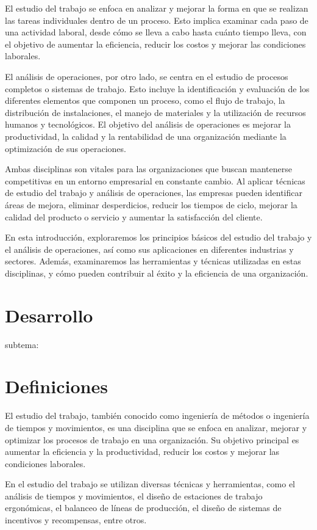 \documentclass[letterpaper,12pt,openright,oneside]{article}
\theoremstyle{plain}
\begin{document}
El estudio del trabajo se enfoca en analizar y mejorar la forma en que se realizan las tareas individuales dentro de un proceso. Esto implica examinar cada paso de una actividad laboral, desde cómo se lleva a cabo hasta cuánto tiempo lleva, con el objetivo de aumentar la eficiencia, reducir los costos y mejorar las condiciones laborales.

El análisis de operaciones, por otro lado, se centra en el estudio de procesos completos o sistemas de trabajo. Esto incluye la identificación y evaluación de los diferentes elementos que componen un proceso, como el flujo de trabajo, la distribución de instalaciones, el manejo de materiales y la utilización de recursos humanos y tecnológicos. El objetivo del análisis de operaciones es mejorar la productividad, la calidad y la rentabilidad de una organización mediante la optimización de sus operaciones.

Ambas disciplinas son vitales para las organizaciones que buscan mantenerse competitivas en un entorno empresarial en constante cambio. Al aplicar técnicas de estudio del trabajo y análisis de operaciones, las empresas pueden identificar áreas de mejora, eliminar desperdicios, reducir los tiempos de ciclo, mejorar la calidad del producto o servicio y aumentar la satisfacción del cliente.

En esta introducción, exploraremos los principios básicos del estudio del trabajo y el análisis de operaciones, así como sus aplicaciones en diferentes industrias y sectores. Además, examinaremos las herramientas y técnicas utilizadas en estas disciplinas, y cómo pueden contribuir al éxito y la eficiencia de una organización.
\section {Desarrollo}

subtema: 
\section{Definiciones}

El estudio del trabajo, también conocido como ingeniería de métodos o ingeniería de tiempos y movimientos, es una disciplina que se enfoca en analizar, mejorar y optimizar los procesos de trabajo en una organización. Su objetivo principal es aumentar la eficiencia y la productividad, reducir los costos y mejorar las condiciones laborales.

En el estudio del trabajo se utilizan diversas técnicas y herramientas, como el análisis de tiempos y movimientos, el diseño de estaciones de trabajo ergonómicas, el balanceo de líneas de producción, el diseño de sistemas de incentivos y recompensas, entre otros.
\end{document}
